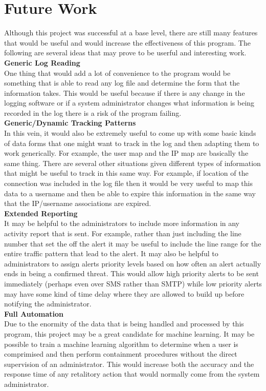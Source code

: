 \documentclass[12pt]{report}
\begin{document}
\section*{Future Work}
	Although this project was successful at a base level, there are still many 
	features that would be useful and would increase the effectiveness of this
	program. The following are several ideas that may prove to be userful and 
	interesting work. \\

	\noindent
	\textbf{Generic Log Reading} \\
	One thing that would add a lot of convenience to the program would 
	be something that is able to read any log file and determine the form that 
	the information takes. This would be useful because if there is any change 
	in the logging software or if a system administrator changes what information 
	is being recorded in the log there is a risk of the program failing. \\

	\noindent
	\textbf{Generic/Dynamic Tracking Patterns} \\
	In this vein, it would also be extremely useful to come up with some basic kinds of 
	data forms that one might want to track in the log and then adapting them to 
	work generically. For example, the user map and the IP map are basically the
	same thing. There are several other situations given different types of 
	information that might be useful to track in this same way. For example, if
	location of the connection was included in the log file then it would be very
	useful to map this data to a username and then be able to expire this information
	in the same way that the IP/username associations are expired. \\

	\noindent
	\textbf{Extended Reporting} \\
	It may be helpful to the administrators to include more information
	in any activity report that is sent. For example, rather than just including
	the line number that set the off the alert it may be useful to include the 
	line range for the entire traffic pattern that lead to the alert. It may also
	be helpful to administrators to assign alerts priority levels based on how 
	often an alert actually ends in being a confirmed threat. This would allow
	high priority alerts to be sent immediately (perhaps even over SMS rather than
	SMTP) while low priority alerts may have some kind of time delay where they
	are allowed to build up before notifying the administrator. \\

	\noindent
	\textbf{Full Automation} \\
	Due to the enormity of the data that is being handled and processed by this
	program, this project may be a great candidate for machine learning. It may
	be possible to train a machine learning algorithm to determine when a user
	is comprimised and then perform containment procedures without the direct 
	supervision of an administrator. This would increase both the accuracy and
	the response time of any retalitory action that would normally come from
	the system administrator. \\
\end{document}
